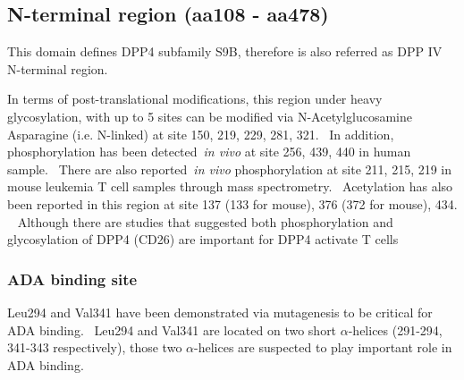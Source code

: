 \subsection{N-terminal region (aa108 - aa478)}

This domain defines DPP4 subfamily S9B, therefore is also referred as DPP IV N-terminal region. 

In terms of post-translational modifications, this region under heavy glycosylation, with up to 5 sites can be modified via N-Acetylglucosamine Asparagine (i.e. N-linked) at site 150, 219, 229, 281, 321.~\cite{Rasmussen2003,Thoma2003,Meng2010,Chen2009,Hiramatsu2003} In addition, phosphorylation has been detected~\textit{in vivo} at site 256, 439, 440 in human sample.~\cite{Hornbeck2015, Mertins2014} There are also reported~\textit{in vivo} phosphorylation at site 211, 215, 219 in mouse leukemia T cell samples through mass spectrometry.~\cite{Hornbeck2015} 
Acetylation has also been reported in this region at site 137 (133 for mouse), 376 (372 for mouse), 434. ~\cite{Lundby2012,Weinert2013} Although there are studies that suggested both phosphorylation and glycosylation of DPP4 (CD26) are important for DPP4 activate T cells 

\subsubsection{ADA binding site}
Leu294 and Val341 have been demonstrated via mutagenesis to be critical for ADA binding.~\cite{Abbott_1999} Leu294 and Val341 are located on two short $\alpha$-helices (291-294, 341-343 respectively), those two $\alpha$-helices are suspected to play important role in ADA binding. 
